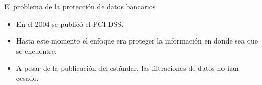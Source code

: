 \begin{frame}{El problema de la protección de datos bancarios}
  \begin{itemize}
    \item En el 2004 se publicó el PCI DSS\footnotemark \cite{pci_dss}.
    \item Hasta este momento el enfoque era proteger la información en donde
      sea que se encuentre.
    \item A pesar de la publicación del estándar, las filtraciones de datos
      no han cesado.
  \end{itemize}
\end{frame}

